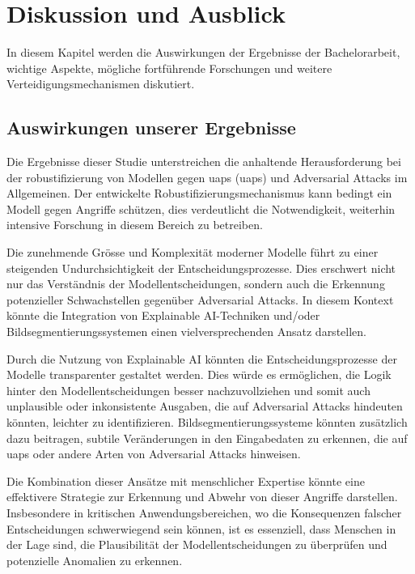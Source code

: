 \section{Diskussion und Ausblick} \label{chap:Diskussion und Ausblick}
In diesem Kapitel werden die Auswirkungen der Ergebnisse der Bachelorarbeit, wichtige Aspekte, mögliche fortführende Forschungen und weitere Verteidigungsmechanismen diskutiert. 

\subsection{Auswirkungen unserer Ergebnisse}

Die Ergebnisse dieser Studie unterstreichen die anhaltende Herausforderung bei der \Gls{robustifizierung} von Modellen gegen \acrlong{uap}s (\acrshort{uap}s) und Adversarial Attacks im Allgemeinen. Der entwickelte Robustifizierungsmechanismus kann bedingt ein Modell gegen Angriffe schützen, dies verdeutlicht  die Notwendigkeit, weiterhin intensive Forschung in diesem Bereich zu betreiben.

Die zunehmende Grösse und Komplexität moderner Modelle führt zu einer steigenden Undurchsichtigkeit der Entscheidungsprozesse. Dies erschwert nicht nur das Verständnis der Modellentscheidungen, sondern auch die Erkennung potenzieller Schwachstellen gegenüber Adversarial Attacks. In diesem Kontext könnte die Integration von Explainable AI-Techniken und/oder Bildsegmentierungssystemen einen vielversprechenden Ansatz darstellen.

Durch die Nutzung von Explainable AI könnten die Entscheidungsprozesse der Modelle transparenter gestaltet werden. Dies würde es ermöglichen, die Logik hinter den Modellentscheidungen besser nachzuvollziehen und somit auch unplausible oder inkonsistente Ausgaben, die auf Adversarial Attacks hindeuten könnten, leichter zu identifizieren. Bildsegmentierungssysteme könnten zusätzlich dazu beitragen, subtile Veränderungen in den Eingabedaten zu erkennen, die auf \acrshort{uap}s oder andere Arten von Adversarial Attacks hinweisen.

Die Kombination dieser Ansätze mit menschlicher Expertise könnte eine effektivere Strategie zur Erkennung und Abwehr von dieser Angriffe darstellen. Insbesondere in kritischen Anwendungsbereichen, wo die Konsequenzen falscher Entscheidungen schwerwiegend sein können, ist es essenziell, dass Menschen in der Lage sind, die Plausibilität der Modellentscheidungen zu überprüfen und potenzielle Anomalien zu erkennen.

